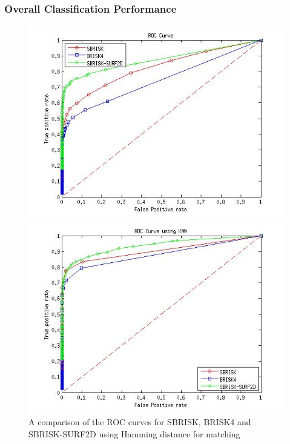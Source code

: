 \documentclass{article}
\begin{document}
\subsubsection{Overall Classification Performance}
\label{sec:rocCurves}

\begin{figure}[h!]
\begin{minipage}[b]{0.5\linewidth}
\includegraphics[scale=0.5]{../Drawings/ROC_General_Hamming.jpg}
\caption{A comparison of the ROC curves for SBRISK, BRISK4 and SBRISK-SURF2D using Hamming distance for matching}
\label{fig:compareHamming}
\end{minipage}
\hspace{0.5cm}
\begin{minipage}[b]{0.5\linewidth}
\includegraphics[scale=0.5]{../Drawings/ROC_General_KNN.jpg}

\end{minipage}
\end{figure}
\end{document}
